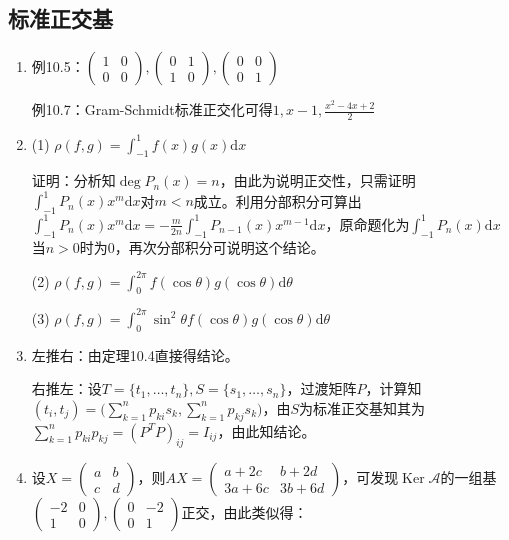 \documentclass[a4paper,UTF8,fontset=windows]{ctexart}
\DeclareMathOperator{\Ker}{Ker}
\begin{document}
\subsection{标准正交基}
\begin{enumerate}
\item
例10.5：$\begin{pmatrix}1&0\\0&0\end{pmatrix},\begin{pmatrix}0&1\\1&0\end{pmatrix},\begin{pmatrix}0&0\\0&1\end{pmatrix}$

例10.7：Gram-Schmidt标准正交化可得$1,x-1,\frac{x^2-4x+2}{2}$

\item
(1) $\rho(f,g)=\int_{-1}^1f(x)g(x)\mathrm{d}x$

证明：分析知$\deg{P_n(x)}=n$，由此为说明正交性，只需证明$\int_{-1}^1P_n(x)x^m\mathrm{d}x$对$m<n$成立。利用分部积分可算出$\int_{-1}^1P_n(x)x^m\mathrm{d}x=-\frac{m}{2n}\int_{-1}^1P_{n-1}(x)x^{m-1}\mathrm{d}x$，原命题化为$\int_{-1}^1P_n(x)\mathrm{d}x$当$n>0$时为0，再次分部积分可说明这个结论。

(2) $\rho(f,g)=\int_{0}^{2\pi}f(\cos\theta)g(\cos\theta)\mathrm{d}\theta$

(3) $\rho(f,g)=\int_{0}^{2\pi}\sin^2\theta f(\cos\theta)g(\cos\theta)\mathrm{d}\theta$

\item
左推右：由定理10.4直接得结论。

右推左：设$T=\{t_1,\dots,t_n\},S=\{s_1,\dots,s_n\}$，过渡矩阵$P$，计算知$(t_i,t_j)=\bigg(\sum_{k=1}^np_{ki}s_k,\sum_{k=1}^np_{kj}s_k\bigg)$，由$S$为标准正交基知其为$\sum_{k=1}^np_{ki}p_{kj}=(P^TP)_{ij}=I_{ij}$，由此知结论。

\item
设$X=\begin{pmatrix}a&b\\c&d\end{pmatrix}$，则$AX=\begin{pmatrix}a+2c&b+2d\\3a+6c&3b+6d\end{pmatrix}$，可发现$\Ker\mathcal{A}$的一组基$\begin{pmatrix}-2&0\\1&0\end{pmatrix},\begin{pmatrix}0&-2\\0&1\end{pmatrix}$正交，由此类似得：


\end{enumerate}
\end{document}
